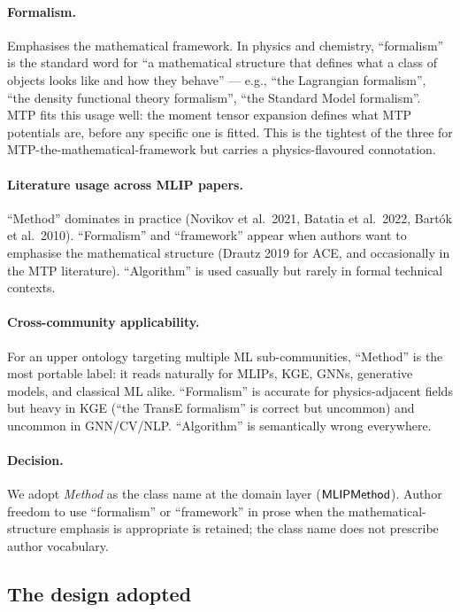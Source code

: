 \paragraph{Formalism.}
Emphasises the mathematical framework. In physics and chemistry,
``formalism'' is the standard word for ``a mathematical structure that
defines what a class of objects looks like and how they behave'' --- e.g.,
``the Lagrangian formalism'', ``the density functional theory
formalism'', ``the Standard Model formalism''. MTP fits this usage
well: the moment tensor expansion defines what MTP potentials are,
before any specific one is fitted. This is the tightest of the three
for MTP-the-mathematical-framework but carries a physics-flavoured
connotation.

\paragraph{Literature usage across MLIP papers.}
``Method'' dominates in practice (Novikov et al.\ 2021, Batatia et al.\
2022, Bart\'ok et al.\ 2010). ``Formalism'' and ``framework'' appear
when authors want to emphasise the mathematical structure (Drautz 2019
for ACE, and occasionally in the MTP literature). ``Algorithm'' is used
casually but rarely in formal technical contexts.

\paragraph{Cross-community applicability.}
For an upper ontology targeting multiple ML sub-communities, ``Method''
is the most portable label: it reads naturally for MLIPs, KGE, GNNs,
generative models, and classical ML alike. ``Formalism'' is accurate
for physics-adjacent fields but heavy in KGE (``the TransE formalism''
is correct but uncommon) and uncommon in GNN/CV/NLP. ``Algorithm'' is
semantically wrong everywhere.

\paragraph{Decision.}
We adopt \emph{Method} as the class name at the domain layer
($\mathsf{MLIPMethod}$). Author freedom to use ``formalism'' or ``framework''
in prose when the mathematical-structure emphasis is appropriate is
retained; the class name does not prescribe author vocabulary.

\subsection{The design adopted}
\label{sec:appendix-method-design}

